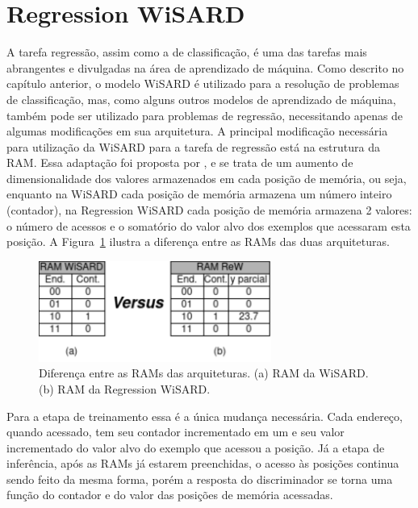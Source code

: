 \section{Regression WiSARD}
A tarefa regressão, assim como a de classificação, é uma das tarefas mais abrangentes e divulgadas na área de aprendizado de máquina. Como descrito no capítulo anterior, o modelo WiSARD é utilizado para a resolução de problemas de classificação, mas, como alguns outros modelos de aprendizado de máquina, também pode ser utilizado para problemas de regressão, necessitando apenas de algumas modificações em sua arquitetura.
A principal modificação necessária para utilização da WiSARD para a tarefa de regressão está na estrutura da RAM. Essa adaptação foi proposta por \citeauthor{rew}, \citeyear{rew} \cite{rew} e se trata de um aumento de dimensionalidade dos valores armazenados em cada posição de memória, ou seja, enquanto na WiSARD cada posição de memória armazena um número inteiro (contador), na Regression WiSARD cada posição de memória armazena 2 valores: o número de acessos e o somatório do valor alvo dos exemplos que acessaram esta posição. A Figura~\ref{fig:ramxram} ilustra a diferença entre as RAMs das duas arquiteturas.

\hspace*{-1.5in}
\begin{figure}[!ht]
    \centering
    \includegraphics[width=3.0in]{img/ramxram.pdf}
    \caption{Diferença entre as RAMs das arquiteturas. (a) RAM da WiSARD. (b) RAM da Regression WiSARD.}
    \label{fig:ramxram}
\end{figure}

Para a etapa de treinamento essa é a única mudança necessária. Cada endereço, quando acessado, tem seu contador incrementado em um e seu valor incrementado do valor alvo do exemplo que acessou a posição. Já a etapa de inferência, após as RAMs já estarem preenchidas, o acesso às posições continua sendo feito da mesma forma, porém a resposta do discriminador se torna uma função do contador e do valor das posições de memória acessadas.

